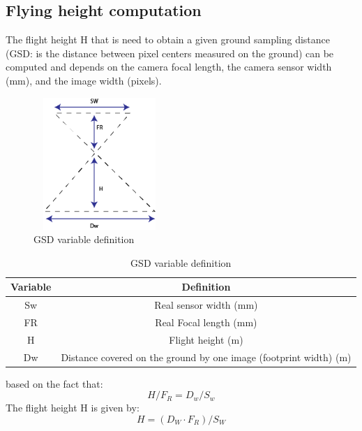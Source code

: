 \subsection{Flying height computation}
The flight height H that is need to obtain a given ground sampling distance (GSD: is the distance between pixel centers measured on the ground) can be computed and depends on the camera focal length, the camera sensor width  (mm), and the image width (pixels).\cite{GSDComputation}
\begin{figure}[H]
\centering
\includegraphics[width=5cm,height=5cm,keepaspectratio]{imagenes/GSD_Varaible.png}
\caption{GSD variable definition}
\label{fig:GSD}
\end{figure}
\begin{table}[]
\centering
\begin{tabular}{|c|c|}
\hline
\textbf{Variable} & \textbf{Definition}                                                                      \\ \hline
Sw                & Real sensor width (mm)                                                                   \\ \hline
FR                & Real Focal length (mm)                                                                   \\ \hline
H                 & Flight height (m)                                                                        \\ \hline
Dw                & Distance covered on the ground by one image (footprint width) (m) \\ \hline
\end{tabular}
\caption{GSD variable definition}
\end{table}
based on the fact that:
\begin{equation}
H/F_{R} = D_{w}/S_{w}
\end{equation}
The flight height H is given by:
\begin{equation}
H = (D_{W}\cdot F_{R})/S_{W}
\label{H}
\end{equation}
